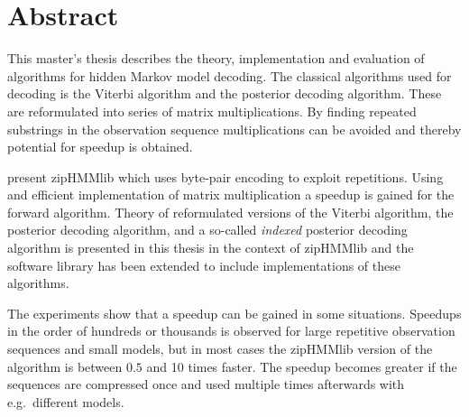 \chapter{Abstract}

This master's thesis describes the theory, implementation and evaluation of
algorithms for hidden Markov model decoding. The classical algorithms used
for decoding is the Viterbi algorithm and the posterior decoding algorithm.
These are reformulated into series of matrix multiplications. By finding
repeated substrings in the observation sequence multiplications can be
avoided and thereby potential for speedup is obtained.

\citet{sand2013ziphmmlib} present zipHMMlib which uses byte-pair encoding to
exploit repetitions. Using and efficient implementation of matrix
multiplication a speedup is gained for the forward algorithm. Theory of
reformulated versions of the Viterbi algorithm, the posterior decoding
algorithm, and a so-called \emph{indexed} posterior decoding algorithm is
presented in this thesis in the context of zipHMMlib and the software library
has been extended to include implementations of these algorithms.

The experiments show that a speedup can be gained in some situations. Speedups
in the order of hundreds or thousands is observed for large repetitive
observation sequences and small models, but in most cases the zipHMMlib version of
the algorithm is between $0.5$ and 10 times faster. The speedup becomes
greater if the sequences are compressed once and used multiple times afterwards
with e.g.\ different models.
